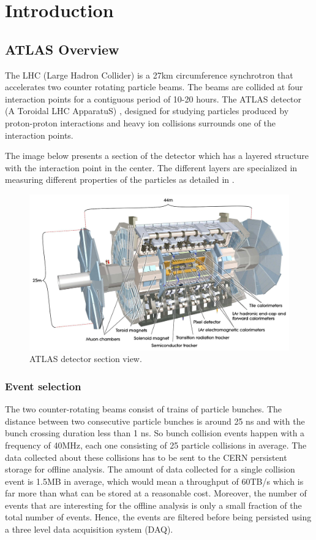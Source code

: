 \chapter{Introduction} %
\label{Capitolul1}

\section{ATLAS Overview}
The LHC (Large Hadron Collider) is a 27km circumference synchrotron that accelerates two counter rotating particle beams. The beams are collided at four interaction points for a contiguous period of 10-20 hours. The ATLAS detector (A Toroidal LHC ApparatuS) \citep{aad2008atlas}, designed for studying particles produced by proton-proton interactions and heavy ion collisions surrounds one of the interaction points. 

The image below presents a section of the detector which has a layered structure with the interaction point in the center. The different layers are specialized in measuring different properties of the particles as detailed in \citep{aad2008atlas}. 

\begin{figure}[ht!]
\centering
\includegraphics[scale=0.2]{Images/Overview.jpg}
\caption{ATLAS detector section view.}
\end{figure}


\subsection*{Event selection}
The two counter-rotating beams consist of trains of particle bunches. The distance between two consecutive particle bunches is around 25 ns and with the bunch crossing duration less than 1 ns. So bunch collision events happen with a frequency of 40MHz, each one consisting of 25 particle collisions in average. The data collected about these collisions has to be sent to the CERN persistent storage \citep{baud2003castor} for offline analysis. The amount of data collected for a single collision event is 1.5MB in average, which would mean a throughput of 60TB/s which is far more than what can be stored at a reasonable cost. Moreover, the number of events that are interesting for the offline analysis is only a small fraction of the total number of events. Hence, the events are filtered before being persisted using a three level data acquisition system (DAQ). 


